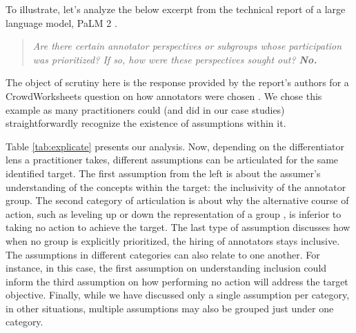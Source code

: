 To illustrate, let's analyze the below excerpt from the technical report of a large language model, PaLM 2 \cite[p.~87]{anil2023palm}. 
\begin{quote}
    \textit{Are there certain annotator perspectives or subgroups whose participation was prioritized? If so, how were these perspectives sought out? \textbf{No.}}
\end{quote}
The object of scrutiny here is the response provided by the report's authors for a CrowdWorksheets question on how annotators were chosen \cite{diaz2022crowdworksheets}. 
We chose this example as many practitioners could (and did in our case studies) straightforwardly recognize the existence of assumptions within it.

Table \ref{tab:explicate} presents our analysis.
Now, depending on the differentiator lens a practitioner takes, different assumptions can be articulated for the same identified target.
The first assumption from the left is about the assumer's understanding of the concepts within the target: the inclusivity of the annotator group.
The second category of articulation is about why the alternative course of action, such as leveling up or down the representation of a group \cite{mittelstadt2023unfairness,corbett-daviesMeasureMismeasureFairness2018}, is inferior to taking no action to achieve the target.
The last type of assumption discusses how when no group is explicitly prioritized, the hiring of annotators stays inclusive.
The assumptions in different categories can also relate to one another. 
For instance, in this case, the first assumption on understanding inclusion could inform the third assumption on how performing no action will address the target objective.
Finally, while we have discussed only a single assumption per category, in other situations, multiple assumptions may also be grouped just under one category.


